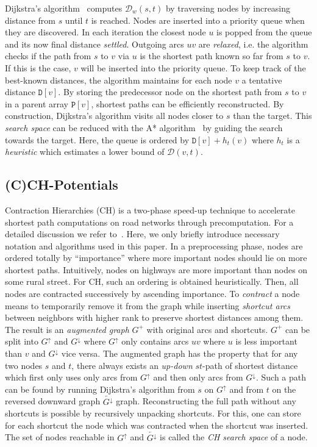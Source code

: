 \documentclass[a4paper,UKenglish,cleveref, autoref, thm-restate]{lipics-v2021}
\newcommand*{\dist}{\mathcal{D}}
\newcommand*{\gchu}{G^{\uparrow}}
\newcommand*{\gchd}{\overleftarrow{G^{\downarrow}}}
\begin{document}
Dijkstra's algorithm~\cite{d-ntpcg-59} computes $\dist_w(s,t)$ by traversing nodes by increasing distance from $s$ until $t$ is reached.
Nodes are inserted into a priority queue when they are discovered.
In each iteration the closest node $u$ is popped from the queue and its now final distance \emph{settled}.
Outgoing arcs $uv$ are \emph{relaxed}, i.e. the algorithm checks if the path from $s$ to $v$ via $u$ is the shortest path known so far from $s$ to $v$.
If this is the case, $v$ will be inserted into the priority queue.
To keep track of the best-known distances, the algorithm maintains for each node $v$ a tentative distance $\mathtt{D}[v]$.
By storing the predecessor node on the shortest path from $s$ to $v$ in a parent array $\mathtt{P}[v]$, shortest paths can be efficiently reconstructed.
By construction, Dijkstra's algorithm visits all nodes closer to $s$ than the target.
This \emph{search space} can be reduced with the A* algorithm~\cite{hnr-afbhd-68} by guiding the search towards the target.
Here, the queue is ordered by $\mathtt{D}[v] + h_t(v)$ where $h_t$ is a \emph{heuristic} which estimates a lower bound of $\dist(v,t)$.

\subsection{(C)CH-Potentials}

Contraction Hierarchies (CH) is a two-phase speed-up technique to accelerate shortest path computations on road networks through precomputation.
For a detailed discussion we refer to~\cite{gssv-erlrn-12}.
Here, we only briefly introduce necessary notation and algorithms used in this paper.
In a preprocessing phase, nodes are ordered totally by ``importance'' where more important nodes should lie on more shortest paths.
Intuitively, nodes on highways are more important than nodes on some rural street.
For CH, such an ordering is obtained heuristically.
Then, all nodes are contracted successively by ascending importance.
To \emph{contract} a node means to temporarily remove it from the graph while inserting \emph{shortcut arcs} between neighbors with higher rank to preserve shortest distances among them.
The result is an \emph{augmented graph} $G^+$ with original arcs and shortcuts.
$G^+$ can be split into $\gchu$ and $G^{\downarrow}$ where $\gchu$ only contains arcs $uv$ where $u$ is less important than $v$ and $G^{\downarrow}$ vice versa.
The augmented graph has the property that for any two nodes $s$ and $t$, there always exists an \emph{up-down} $st$-path of shortest distance which first only uses only arcs from $\gchu$ and then only arcs from $G^{\downarrow}$.
Such a path can be found by running Dijkstra's algorithm from $s$ on $\gchu$ and from $t$ on the reversed downward graph $\gchd$ graph.
Reconstructing the full path without any shortcuts is possible by recursively unpacking shortcuts.
For this, one can store for each shortcut the node which was contracted when the shortcut was inserted.
The set of nodes reachable in $\gchu$ and $\gchd$ is called the \emph{CH search space} of a node.
\end{document}
